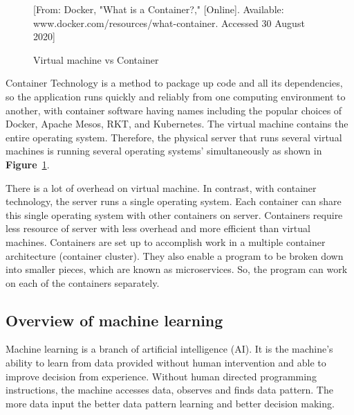 \documentclass[12pt,oneside,openright,a4paper]{cpe-english-project}
\begin{document}
\begin{figure}[!h]\centering
  \setlength{\fboxrule}{0mm} %
  \setlength{\fboxsep}{0cm}
  \caption{Virtual machine vs Container}\label{fig:vmVSContainer}
  [From: Docker, "What is a Container?," [Online]. Available: www.docker.com/resources/what-container. Accessed 30 August 2020]
\end{figure}

\hspace{10mm}Container Technology is a method to package up code and all its dependencies, so the application runs quickly and reliably from one computing environment to another, with container software having names including the popular choices of Docker, Apache Mesos, RKT, and Kubernetes.  The virtual machine contains the entire operating system.  Therefore, the physical server that runs several virtual machines is running several operating systems’ simultaneously as shown in \textbf{Figure}~\ref{fig:vmVSContainer}. \cite{docker}

\hspace{10mm}There is a lot of overhead on virtual machine.  In contrast, with container technology, the server runs a single operating system.  Each container can share this single operating system with other containers on server.  Containers require less resource of server with less overhead and more efficient than virtual machines. \cite{container}   Containers are set up to accomplish work in a multiple container architecture (container cluster).  They also enable a program to be broken down into smaller pieces, which are known as microservices.  So, the program can work on each of the containers separately.

\subsection{Overview of machine learning}
\hspace{10mm}Machine learning is a branch of artificial intelligence (AI).  It is the machine’s ability to learn from data provided without human intervention and able to improve decision from experience.  Without human directed programming instructions, the machine accesses data, observes and finds data pattern.  The more data input the better data pattern learning and better decision making.\cite{ml}
\end{document}
